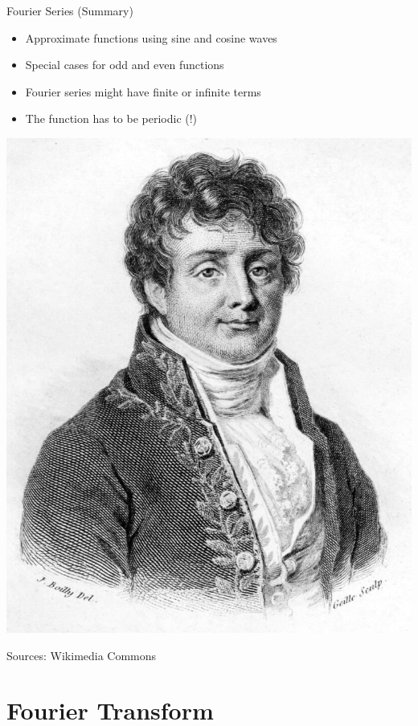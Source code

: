 \begin{frame}[t]{Fourier Series (Summary)}
    \begin{itemize}
        \item Approximate functions using sine and cosine waves
        \item Special cases for odd and even functions
        \item Fourier series might have finite or infinite terms
        \item The function has to be periodic (!)
    \end{itemize}

    \begin{flushright}

        \includegraphics[height=.45\textheight ]{images/Fourier}

        \scriptsize Sources: Wikimedia Commons
    \end{flushright}
\end{frame}



\section{Fourier Transform}%
\label{sec:fourier_transform}




